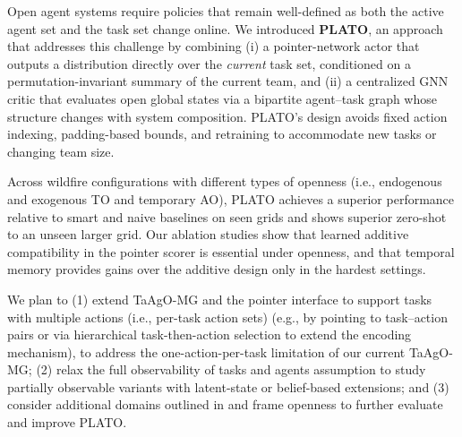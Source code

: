 
Open agent systems require policies that remain well-defined as both the active agent set and the task set change online. We introduced \textbf{PLATO}, an approach that addresses this challenge by combining (i) a pointer-network actor that outputs a distribution directly over the \emph{current} task set, conditioned on a permutation-invariant summary of the current team, and (ii) a centralized GNN critic that evaluates open global states via a bipartite agent--task graph whose structure changes with system composition. PLATO's design avoids fixed action indexing, padding-based bounds, and retraining to accommodate new tasks or changing team size.

Across wildfire configurations with different types of openness (i.e., endogenous and exogenous TO and temporary AO), PLATO achieves a superior performance relative to smart and naive baselines on seen grids and shows superior zero-shot to an unseen larger grid. Our ablation studies show that learned additive compatibility in the pointer scorer is essential under openness, and that temporal memory provides gains over the additive design only in the hardest settings.


We plan to (1) extend TaAgO-MG and the pointer interface to support tasks with multiple actions (i.e., per-task action sets) (e.g., by pointing to task--action pairs or via hierarchical task-then-action selection to extend the encoding mechanism), to address the one-action-per-task limitation of our current TaAgO-MG; (2) relax the full observability of tasks and agents assumption to study partially observable variants with latent-state or belief-based extensions; and (3) consider additional domains outlined in \cite{aimag_eck} and frame openness to further evaluate and improve PLATO.



